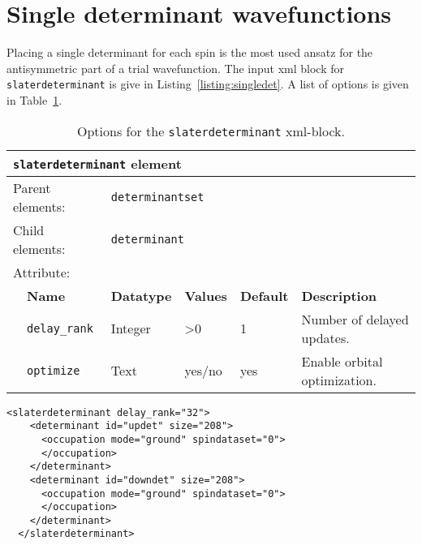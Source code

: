 \section{Single determinant wavefunctions}
\label{sec:singledeterminant}
Placing a single determinant for each spin is the most used ansatz for the antisymmetric part of a trial wavefunction.
The input xml block for \texttt{slaterdeterminant} is give in Listing~\ref{listing:singledet}. A list of options is given in
Table~\ref{table:singledet}.

\begin{table}[h]
\begin{center}
\begin{tabularx}{\textwidth}{l l l l l X }
\hline
\multicolumn{6}{l}{\texttt{slaterdeterminant} element} \\
\hline
\multicolumn{2}{l}{Parent elements:} & \multicolumn{4}{l}{\texttt{determinantset}}\\
\multicolumn{2}{l}{Child  elements:} & \multicolumn{4}{l}{\texttt{determinant}}\\
\multicolumn{2}{l}{Attribute:} & \multicolumn{4}{l}{}\\
   &   \bfseries Name       & \bfseries Datatype & \bfseries Values & \bfseries Default & \bfseries Description \\
   &   \texttt{delay\_rank} &  Integer           &  >0              & 1           &  Number of delayed updates. \\
   &   \texttt{optimize}    &  Text              &  yes/no          & yes         &  Enable orbital optimization. \\
  \hline
\end{tabularx}
\end{center}
\caption{Options for the \texttt{slaterdeterminant} xml-block.}
\label{table:singledet}
\end{table}

\begin{lstlisting}[style=QMCPXML,caption=Slaterdeterminant set XML element.\label{listing:singledet}]
  <slaterdeterminant delay_rank="32">
    <determinant id="updet" size="208">
      <occupation mode="ground" spindataset="0">
      </occupation>
    </determinant>
    <determinant id="downdet" size="208">
      <occupation mode="ground" spindataset="0">
      </occupation>
    </determinant>
  </slaterdeterminant>
\end{lstlisting}

